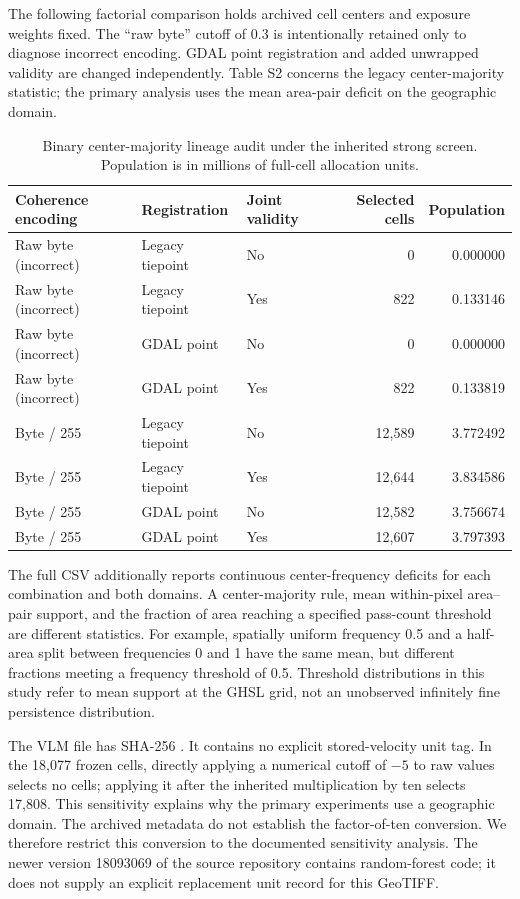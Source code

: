 \documentclass[10pt,a4paper]{article}
\begin{document}
The following factorial comparison holds archived cell centers and exposure weights fixed. The ``raw byte'' cutoff of 0.3 is intentionally retained only to diagnose incorrect encoding. GDAL point registration and added unwrapped validity are changed independently. Table S2 concerns the legacy center-majority statistic; the primary analysis uses the mean area-pair deficit on the geographic domain.
\begin{table}[htbp]\centering\small
\caption{Binary center-majority lineage audit under the inherited strong screen. Population is in millions of full-cell allocation units.}
\begin{tabular}{lllrr}\toprule
Coherence encoding & Registration & Joint validity & Selected cells & Population\\\midrule
Raw byte (incorrect) & Legacy tiepoint & No & 0 & 0.000000 \\
Raw byte (incorrect) & Legacy tiepoint & Yes & 822 & 0.133146 \\
Raw byte (incorrect) & GDAL point & No & 0 & 0.000000 \\
Raw byte (incorrect) & GDAL point & Yes & 822 & 0.133819 \\
Byte / 255 & Legacy tiepoint & No & 12,589 & 3.772492 \\
Byte / 255 & Legacy tiepoint & Yes & 12,644 & 3.834586 \\
Byte / 255 & GDAL point & No & 12,582 & 3.756674 \\
Byte / 255 & GDAL point & Yes & 12,607 & 3.797393 \\
\bottomrule\end{tabular}

\end{table}

The full CSV additionally reports continuous center-frequency deficits for each combination and both domains. A center-majority rule, mean within-pixel area--pair support, and the fraction of area reaching a specified pass-count threshold are different statistics. For example, spatially uniform frequency 0.5 and a half-area split between frequencies 0 and 1 have the same mean, but different fractions meeting a frequency threshold of 0.5. Threshold distributions in this study refer to mean support at the GHSL grid, not an unobserved infinitely fine persistence distribution.

The VLM file has SHA-256 . It contains no explicit stored-velocity unit tag. In the 18,077 frozen cells, directly applying a numerical cutoff of $-5$ to raw values selects no cells; applying it after the inherited multiplication by ten selects 17,808. This sensitivity explains why the primary experiments use a geographic domain. The archived metadata do not establish the factor-of-ten conversion. We therefore restrict this conversion to the documented sensitivity analysis. The newer version 18093069 of the source repository contains random-forest code; it does not supply an explicit replacement unit record for this GeoTIFF.
\end{document}
